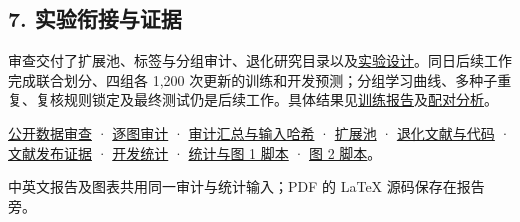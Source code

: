 \documentclass[
  10pt,
]{article}
\begin{document}
\subsection{7.
实验衔接与证据}\label{ux5b9eux9a8cux8854ux63a5ux4e0eux8bc1ux636e}

审查交付了扩展池、标签与分组审计、退化研究目录以及\href{experiment-proposal.json}{实验设计}。同日后续工作完成联合划分、四组各
1,200
次更新的训练和开发预测；分组学习曲线、多种子重复、复核规则锁定及最终测试仍是后续工作。具体结果见\href{../training-results/training-results.zh.md}{训练报告}及\href{../experimental-analysis/experimental-analysis.zh.md}{配对分析}。

\href{../../../../data/audit/data_expansion_20261113/public_dataset_review.md}{公开数据审查}
·
\href{../../../../data/audit/data_expansion_20261113/local_decisions.csv}{逐图审计}
·
\href{../../../../data/audit/data_expansion_20261113/local_summary.json}{审计汇总与输入哈希}
· \href{../../../../data/prepared/expansion_20261113/README.md}{扩展池}
·
\href{../../../../data/audit/data_expansion_20261113/degradation_review.md}{退化文献与代码}
·
\href{../../../../data/audit/data_expansion_20261113/degradation_sources.json}{文献发布证据}
· \href{development_analysis.json}{开发统计} ·
\href{analyze_splits.py}{统计与图 1 脚本} · \href{plot_admission.py}{图
2 脚本}。

中英文报告及图表共用同一审计与统计输入；PDF 的 LaTeX 源码保存在报告旁。
\end{document}
